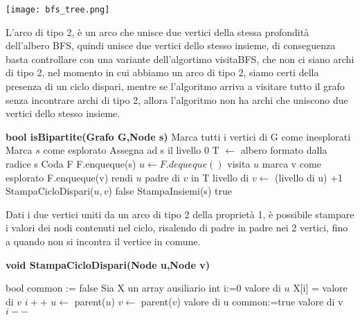 \documentclass{article}
\begin{document}
\begin{center}
  \texttt{[image: bfs\_tree.png]}
\end{center}

L'arco di tipo 2, è un arco che unisce due vertici della stessa profondità 
dell'albero BFS, quindi unisce due vertici dello stesso insieme, di conseguenza basta 
controllare con una variante dell'algortimo visitaBFS, che non ci siano archi 
di tipo 2, nel momento in cui abbiamo un arco di tipo 2, siamo certi della 
presenza di un ciclo dispari, mentre se l'algoritmo arriva a visitare tutto il grafo
senza incontrare archi di tipo 2, allora l'algoritmo non ha archi che uniscono
due vertici dello stesso insieme.

\begin{algorithm}
\begin{algorithmic}[1]
\STATE \textbf{bool isBipartite(Grafo G,Node s)}
\vspace{1em}
\STATE Marca tutti i vertici di G come inesplorati
\STATE Marca $s$ come esplorato
\STATE Assegna ad s il livello 0  
\STATE T $\leftarrow$ albero formato dalla radice s
\STATE Coda F
\STATE F.enqueque(s)
\STATE$u \leftarrow F.dequeque()$ 
\STATE visita $u$
      \STATE marca v come esplorato
      \STATE F.enqueque(v)
      \STATE rendi $u$ padre di $v$ in T
      \STATE livello di $v \leftarrow $ (livello di u) +1
    \ENDIF 
      \STATE StampaCicloDispari($u,v$)
      \RETURN false
    \ENDIF
\ENDFOR
\ENDWHILE
\STATE StampaInsiemi(s)
\RETURN true
\end{algorithmic} 
\end{algorithm} 

\newpage

Dati i due vertici uniti da un arco di tipo 2 della proprietà 1, è possibile 
stampare i valori dei nodi contenuti nel ciclo, risalendo di padre in padre 
nei 2 vertici, fino a quando non si incontra il vertice in comune.

\begin{algorithm}
\begin{algorithmic}[1]
\STATE \textbf{void StampaCicloDispari(Node u,Node v)}
\vspace{1em}

\STATE bool common := false
\STATE Sia X un array ausiliario
\STATE int i:=0
\PRINT valore di $u$
\STATE X[i] = valore di $v$
\STATE $i++$
\STATE $u \leftarrow$ parent($u$)
\STATE $v \leftarrow$ parent($v$) 
\PRINT valore di u
\STATE common:=true
\ENDIF
\ENDWHILE
{}
\PRINT valore di v 
\STATE $i--$
\ENDWHILE
\end{algorithmic} 
\end{algorithm} 
\end{document}
